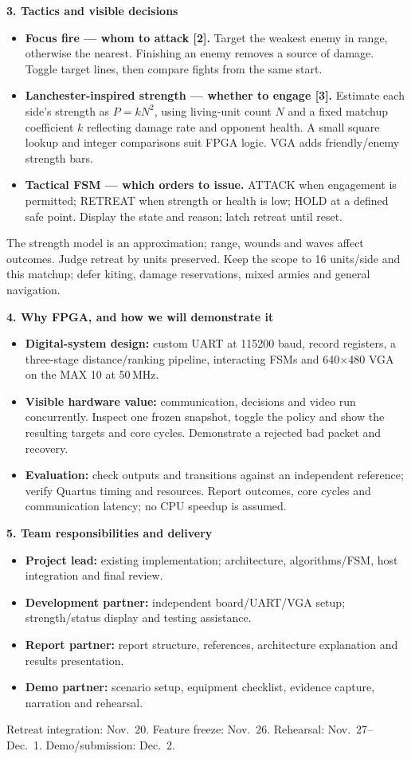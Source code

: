 \documentclass[10pt,letterpaper]{article}
\newcommand{\heading}[1]{\par\vspace{4pt}\textbf{#1}\par}
\begin{document}
\heading{3. Tactics and visible decisions}
\begin{itemize}
\item \textbf{Focus fire --- whom to attack [2].} Target the weakest enemy in range, otherwise the nearest. Finishing an enemy removes a source of damage. Toggle target lines, then compare fights from the same start.
\item \textbf{Lanchester-inspired strength --- whether to engage [3].} Estimate each side's strength as $P=kN^2$, using living-unit count $N$ and a fixed matchup coefficient $k$ reflecting damage rate and opponent health. A small square lookup and integer comparisons suit FPGA logic. VGA adds friendly/enemy strength bars.
\item \textbf{Tactical FSM --- which orders to issue.} ATTACK when engagement is permitted; RETREAT when strength or health is low; HOLD at a defined safe point. Display the state and reason; latch retreat until reset.
\end{itemize}
The strength model is an approximation; range, wounds and waves affect outcomes. Judge retreat by units preserved. Keep the scope to 16 units/side and this matchup; defer kiting, damage reservations, mixed armies and general navigation.

\heading{4. Why FPGA, and how we will demonstrate it}
\begin{itemize}
\item \textbf{Digital-system design:} custom UART at 115200 baud, record registers, a three-stage distance/ranking pipeline, interacting FSMs and 640$\times$480 VGA on the MAX 10 at 50\,MHz.
\item \textbf{Visible hardware value:} communication, decisions and video run concurrently. Inspect one frozen snapshot, toggle the policy and show the resulting targets and core cycles. Demonstrate a rejected bad packet and recovery.
\item \textbf{Evaluation:} check outputs and transitions against an independent reference; verify Quartus timing and resources. Report outcomes, core cycles and communication latency; no CPU speedup is assumed.
\end{itemize}

\heading{5. Team responsibilities and delivery}
\begin{itemize}
\item \textbf{Project lead:} existing implementation; architecture, algorithms/FSM, host integration and final review.
\item \textbf{Development partner:} independent board/UART/VGA setup; strength/status display and testing assistance.
\item \textbf{Report partner:} report structure, references, architecture explanation and results presentation.
\item \textbf{Demo partner:} scenario setup, equipment checklist, evidence capture, narration and rehearsal.
\end{itemize}
Retreat integration: Nov.~20. Feature freeze: Nov.~26. Rehearsal: Nov.~27--Dec.~1. Demo/submission: Dec.~2.
\end{document}
